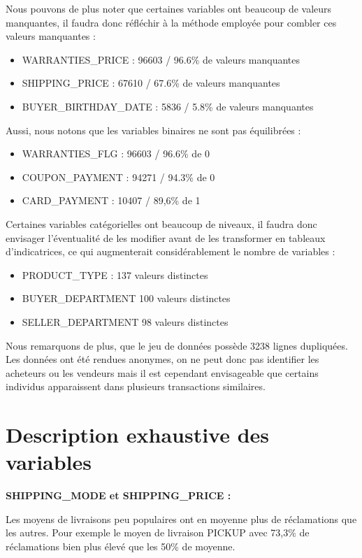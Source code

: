 Nous pouvons de plus noter que certaines variables ont beaucoup de valeurs manquantes, il 
faudra donc réfléchir à la méthode employée pour combler ces valeurs manquantes :

\begin{itemize}
\item WARRANTIES_PRICE : 96603 / 96.6\% de valeurs manquantes
\item SHIPPING_PRICE : 67610 / 67.6\% de valeurs manquantes
\item BUYER_BIRTHDAY_DATE : 5836 / 5.8\% de valeurs manquantes
\end{itemize}

Aussi, nous notons que les variables binaires ne sont pas équilibrées :

\begin{itemize}
\item WARRANTIES_FLG : 96603 / 96.6\% de 0
\item COUPON_PAYMENT : 94271 / 94.3\% de 0
\item CARD_PAYMENT : 10407 / 89,6\% de 1
\end{itemize}

Certaines variables catégorielles ont beaucoup de niveaux, il faudra donc envisager 
l'éventualité de les modifier avant de les transformer en tableaux d'indicatrices, ce qui
augmenterait considérablement le nombre de variables :

\begin{itemize}
\item PRODUCT_TYPE : 137 valeurs distinctes
\item BUYER_DEPARTMENT 100 valeurs distinctes
\item SELLER_DEPARTMENT 98 valeurs distinctes
\end{itemize}

Nous remarquons de plus, que le jeu de données possède 3238 lignes dupliquées. Les
données ont été rendues anonymes, on ne peut donc pas identifier les acheteurs ou les
vendeurs mais il est cependant envisageable que certains individus apparaissent dans 
plusieurs transactions similaires.

\section{Description exhaustive des variables}

\textbf{SHIPPING_MODE et SHIPPING_PRICE :}

Les moyens de livraisons peu populaires ont en moyenne plus de réclamations que les autres.
Pour exemple le moyen de livraison PICKUP avec 73,3\% de réclamations bien plus élevé que 
les 50\% de moyenne.

